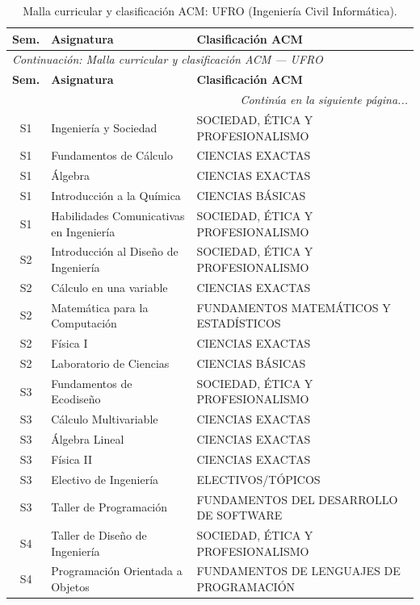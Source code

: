 \documentclass[11pt,a4paper]{article}
\begin{document}
\begin{small}
\begin{longtable}{c >{\raggedright\arraybackslash}p{8.5cm} >{\raggedright\arraybackslash}p{5.5cm}}
\caption{Malla curricular y clasificación ACM: UFRO (Ingeniería Civil Informática).} \label{tab:UFRO13} \\
\toprule
\textbf{Sem.} & \textbf{Asignatura} & \textbf{Clasificación ACM} \\
\midrule
\endfirsthead
\multicolumn{3}{l}{\small\textit{Continuación: Malla curricular y clasificación ACM --- UFRO}} \\[3pt]
\toprule
\textbf{Sem.} & \textbf{Asignatura} & \textbf{Clasificación ACM} \\
\midrule
\endhead
\midrule
\multicolumn{3}{r}{\small\textit{Continúa en la siguiente página...}} \\
\endfoot
\bottomrule
\endlastfoot
S1 & Ingeniería y Sociedad & SOCIEDAD, ÉTICA Y PROFESIONALISMO \\
S1 & Fundamentos de Cálculo & CIENCIAS EXACTAS \\
S1 & Álgebra & CIENCIAS EXACTAS \\
S1 & Introducción a la Química & CIENCIAS BÁSICAS \\
S1 & Habilidades Comunicativas en Ingeniería & SOCIEDAD, ÉTICA Y PROFESIONALISMO \\
S2 & Introducción al Diseño de Ingeniería & SOCIEDAD, ÉTICA Y PROFESIONALISMO \\
S2 & Cálculo en una variable & CIENCIAS EXACTAS \\
S2 & Matemática para la Computación & FUNDAMENTOS MATEMÁTICOS Y ESTADÍSTICOS \\
S2 & Física I & CIENCIAS EXACTAS \\
S2 & Laboratorio de Ciencias & CIENCIAS BÁSICAS \\
S3 & Fundamentos de Ecodiseño & SOCIEDAD, ÉTICA Y PROFESIONALISMO \\
S3 & Cálculo Multivariable & CIENCIAS EXACTAS \\
S3 & Álgebra Lineal & CIENCIAS EXACTAS \\
S3 & Física II & CIENCIAS EXACTAS \\
S3 & Electivo de Ingeniería & ELECTIVOS/TÓPICOS \\
S3 & Taller de Programación & FUNDAMENTOS DEL DESARROLLO DE SOFTWARE \\
S4 & Taller de Diseño de Ingeniería & SOCIEDAD, ÉTICA Y PROFESIONALISMO \\
S4 & Programación Orientada a Objetos & FUNDAMENTOS DE LENGUAJES DE PROGRAMACIÓN \\

\end{longtable}
\end{small}
\end{document}
